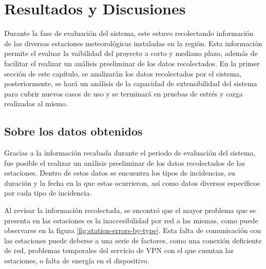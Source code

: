 \chapter{Resultados y Discusiones}


Durante la fase de evaluación del sistema, este estuvo recolectando información de las diversas estaciones meteorológicas instaladas en la región. Esta información permite el evaluar la vaibilidad del proyecto a corto y mediano plazo, además de facilitar el realizar un análisis preeliminar de los datos recolectados. En la primer sección de este capítulo, se analizarán los datos recolectados por el sistema, posteriormente, se hará un análisis de la capacidad de extensibilidad del sistema para cubrir nuevos casos de uso y se terminará en pruebas de estrés y carga realizadas al mismo.

\section{Sobre los datos obtenidos}

Gracias a la información recabada durante el periodo de evaluación del sistema, fue posible el realizar un análisis preeliminar de los datos recolectados de las estaciones. Dentro de estos datos se encuentra los tipos de incidencias, su duración y la fecha en la que estas ocurrieron, así como datos diversos específicos por cada tipo de incidencia.

Al revisar la información recolectada, se encontró que el mayor problema que se presenta en las estaciones es la inaccesibilidad por red a las mismas, como puede observarse en la figura \ref{fig:station-errors-by-type}. Esta falta de comunicación con las estaciones puede deberse a una serie de factores, como una conexión deficiente de red, problemas temporales del servicio de VPN con el que cuentan las estaciones, o falta de energía en el dispositivo.

